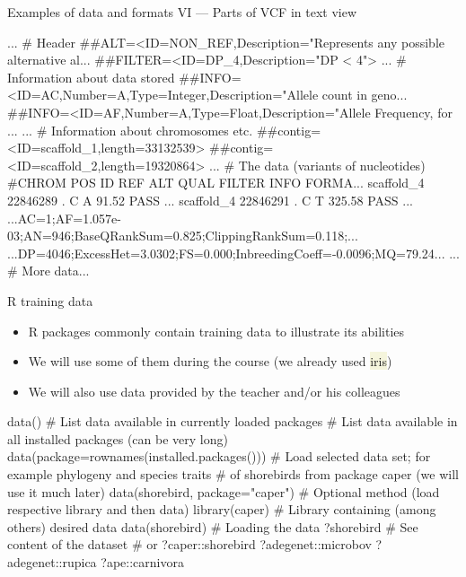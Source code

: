 \documentclass[compress, xelatex, 11pt, xcolor=svgnames, aspectratio=169,
	hyperref={
		bookmarks=true,
		unicode=true,
		colorlinks=true,
		pdftitle={Molecular data in R},
		plainpages=false,
		pdfauthor={Vojtech Zeisek},
		pdfsubject={Course about phylogeny and evolution in R},
		pdfcreator={XeLaTeX},
		pdfkeywords={R, evolution, phylogeny, molecular data},
		linkcolor=Crimson, %
		anchorcolor=Magenta, %
		citecolor=Magenta, %
		filecolor=Magenta, %
		menucolor=Magenta, %
		urlcolor=DodgerBlue, %
		},
	url={hyphens, lowtilde} %
	]{beamer}
\renewcommand{\texttt}[1]{\colorbox{Beige}{{\ttfamily #1}}}
\begin{document}
\begin{frame}[fragile]{Examples of data and formats VI --- Parts of VCF in text view}
	\begin{spluscode}
    ... # Header
    ##ALT=<ID=NON_REF,Description="Represents any possible alternative al...
    ##FILTER=<ID=DP_4,Description="DP < 4">
    ... # Information about data stored
    ##INFO=<ID=AC,Number=A,Type=Integer,Description="Allele count in geno...
    ##INFO=<ID=AF,Number=A,Type=Float,Description="Allele Frequency, for ...
    ... # Information about chromosomes etc.
    ##contig=<ID=scaffold_1,length=33132539>
    ##contig=<ID=scaffold_2,length=19320864>
    ... # The data (variants of nucleotides)
    #CHROM  POS     ID      REF     ALT     QUAL    FILTER  INFO    FORMA...
    scaffold_4      22846289        .       C       A       91.52   PASS ...
    scaffold_4      22846291        .       C       T       325.58  PASS ...
    ...AC=1;AF=1.057e-03;AN=946;BaseQRankSum=0.825;ClippingRankSum=0.118;...
    ...DP=4046;ExcessHet=3.0302;FS=0.000;InbreedingCoeff=-0.0096;MQ=79.24...
    ... # More data...
	\end{spluscode}
\end{frame}

\begin{frame}[fragile]{R training data}
	\begin{itemize}
		\item R packages commonly contain training data to illustrate its abilities
		\item We will use some of them during the course (we already used \texttt{iris})
		\item We will also use data provided by the teacher and/or his colleagues
	\end{itemize}
	\begin{spluscode}
    data() # List data available in currently loaded packages
    # List data available in all installed packages (can be very long)
    data(package=rownames(installed.packages()))
    # Load selected data set; for example phylogeny and species traits
    # of shorebirds from package caper (we will use it much later)
    data(shorebird, package="caper")
    # Optional method (load respective library and then data)
    library(caper) # Library containing (among others) desired data
    data(shorebird) # Loading the data
    ?shorebird # See content of the dataset # or ?caper::shorebird
    ?adegenet::microbov
    ?adegenet::rupica
    ?ape::carnivora
	\end{spluscode}
\end{frame}
\end{document}
